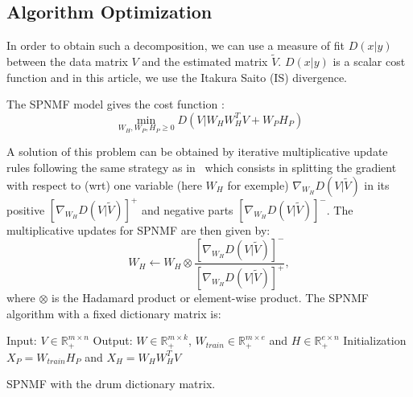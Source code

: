 \documentclass{article}
\begin{document}
\subsection{Algorithm Optimization}

In order to obtain such a decomposition, we can use a measure of fit $D(x|y)$ between the data matrix $V$ and the estimated matrix $\tilde{V}$. $D(x|y)$ is a scalar cost function and in this article, we use the Itakura Saito (IS) divergence.



The SPNMF model gives the cost function : 
\begin{equation}\label{InitCost}
\min_{W_H,W_P,H_P \geq 0} D(V|W_{H}W_{H}^{T}V + W_{P} H_{P})  
\end{equation}

A solution of this problem can be obtained by iterative multiplicative update rules following the same strategy as in~\cite{yuanOja2005,Lee01algorithmsfor} which consists in splitting the gradient with respect to (wrt) one variable (here $W_H$ for exemple) $\nabla_{W_H} D(V|\tilde{V})$ in its positive $[\nabla_{W_H} D(V|\tilde{V})]^{+}$ and negative parts $[\nabla_{W_H} D(V|\tilde{V})]^{-}$.
The multiplicative updates for SPNMF are then given by: 
$$W_{H} \leftarrow W_{H} \otimes \frac{ [\nabla_{W_H} D(V|\tilde{V})]^{-} }{[\nabla_{W_H} D(V|\tilde{V})]^{+}}, $$
where $\otimes$ is the Hadamard product or element-wise product. The SPNMF algorithm with a fixed dictionary matrix is:
 
\begin{algorithm}[h]
 Input: $V \in \mathbb{R}_{+}^{m \times n} $
 Output: $W \in \mathbb{R}_{+}^{m \times k}$, $W_{train} \in \mathbb{R}_+^{m \times e}$ and $H \in \mathbb{R}_{+}^{e \times n}$
 Initialization\;
 $ X_P = W_{train}H_P $ and
 $ X_H = W_HW_H^TV $ 
  
\vspace{0.2cm}
 \caption{SPNMF with the drum dictionary matrix.}\label{AlgoDictionary}
\end{algorithm}
\end{document}
